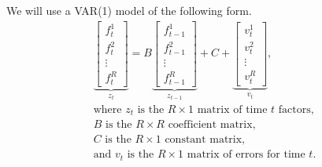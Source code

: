 \documentclass[11pt, letterpaper]{article}\usepackage[]{graphicx}\usepackage[]{color}
\begin{document}
We will use a VAR(1) model of the following form.
\begin{align*}
\underbrace{\begin{bmatrix}
	f^1_{t}\\
	f^2_{t}\\
	\vdots \\
	f^R_{t}
\end{bmatrix}}_{z_t}
=
B
\underbrace{\begin{bmatrix}
	f^1_{t-1}\\
	f^2_{t-1}\\
	\vdots \\
	f^R_{t-1}
\end{bmatrix}}_{z_{t-1}}
+
C
+
\underbrace{\begin{bmatrix}
v^1_t\\
v^2_t\\
\vdots\\
v^R_t
\end{bmatrix}}_{v_t},\\
\text{where $z_t$ is the $R \times 1$ matrix of time $t$ factors,}\\
\text{$B$ is the $R \times R$ coefficient matrix,}\\
\text{$C$ is the $R \times 1$ constant matrix,}\\
\text{and $v_t$ is the $R \times 1$ matrix of errors for time $t$.}
\end{align*}
\end{document}
